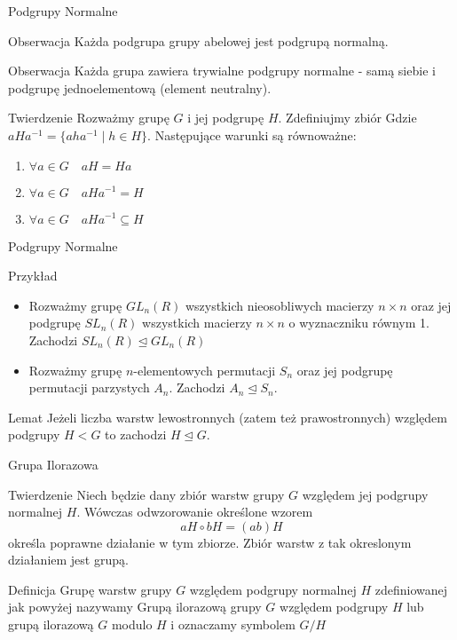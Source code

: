 \documentclass{beamer}
\begin{document}
\begin{frame}{Podgrupy Normalne}
    \begin{alertblock}{Obserwacja}
        Każda podgrupa grupy abelowej jest podgrupą normalną.
    \end{alertblock}
    \pause 
    \begin{alertblock}{Obserwacja}
        Każda grupa zawiera trywialne podgrupy normalne - samą siebie i podgrupę jednoelementową (element neutralny). 
    \end{alertblock}
    \pause 
    \begin{block}{Twierdzenie}
        Rozważmy grupę $G$ i jej podgrupę $H$. Zdefiniujmy zbiór Gdzie $aHa^{-1} = \{aha^{-1} \mid h \in H\}$. Następujące warunki są równoważne:
        \begin{enumerate}
            \item $\forall a \in G \quad aH = Ha$ 
            \item $\forall a \in G \quad aHa^{-1} = H$
            \item $\forall a \in G \quad aHa^{-1} \subseteq H$
        \end{enumerate}
    \end{block}
\end{frame}

\begin{frame}{Podgrupy Normalne}
    \begin{exampleblock}{Przykład}
        \begin{itemize}
            \item Rozważmy grupę $GL_n(R)$ wszystkich nieosobliwych macierzy $n \times n$ oraz jej podgrupę $SL_n(R)$ wszystkich macierzy $n\times n$ o wyznaczniku równym 1. Zachodzi $SL_n(R) \trianglelefteq GL_n(R)$
            \item Rozważmy grupę $n$-elementowych permutacji $S_n$ oraz jej podgrupę permutacji parzystych $A_n$. Zachodzi $A_n \trianglelefteq S_n.$
        \end{itemize}
    \end{exampleblock}
    \pause
    \begin{block}{Lemat}
        Jeżeli liczba warstw lewostronnych (zatem też prawostronnych) względem podgrupy $H < G$ to zachodzi $H \trianglelefteq G$.
    \end{block}
\end{frame}

\begin{frame}{Grupa Ilorazowa}
    \begin{block}{Twierdzenie}
        Niech będzie dany zbiór warstw grupy $G$ względem jej podgrupy normalnej $H$.
        Wówczas odwzorowanie określone wzorem
        $$aH \circ bH = (ab)H $$
        określa poprawne działanie w tym zbiorze. Zbiór warstw z tak okreslonym działaniem jest grupą.
    \end{block}
    \pause 
    \begin{block}{Definicja}
        Grupę warstw grupy $G$ względem podgrupy normalnej $H$ zdefiniowanej jak powyżej nazywamy
        \alert{Grupą ilorazową} grupy $G$ względem podgrupy $H$ lub grupą ilorazową $G$ modulo $H$ i oznaczamy symbolem $G/H$
    \end{block}
\end{frame}
\end{document}
